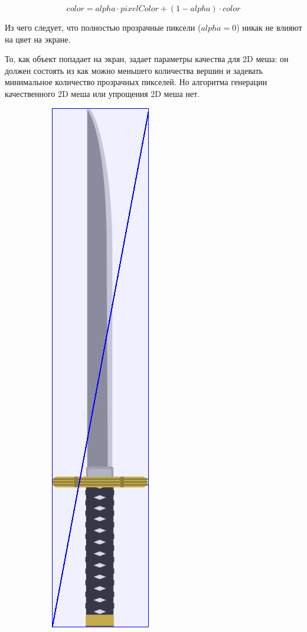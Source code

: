 \documentclass{fefu_thesis/cls/fefu}
\begin{document}
    \[
        color = alpha \cdot pixelColor + (1 - alpha) \cdot color
    \]

    Из чего следует, что полностью прозрачные пиксели ($alpha = 0$) никак не влияют на цвет на экране.

    То, как объект попадает на экран, задает параметры качества для 2D меша: он должен состоять из как можно меньшего количества вершин и задевать минимальное количество прозрачных пикселей. Но алгоритма генерации качественного 2D меша или упрощения 2D меша нет.

    \begin{figure}[H]
        \centering
        \begin{subfigure}[c]{.49\linewidth}
            \centering
            \includegraphics{images/katana_rect.png}

\end{subfigure}
\end{figure}
\end{document}

